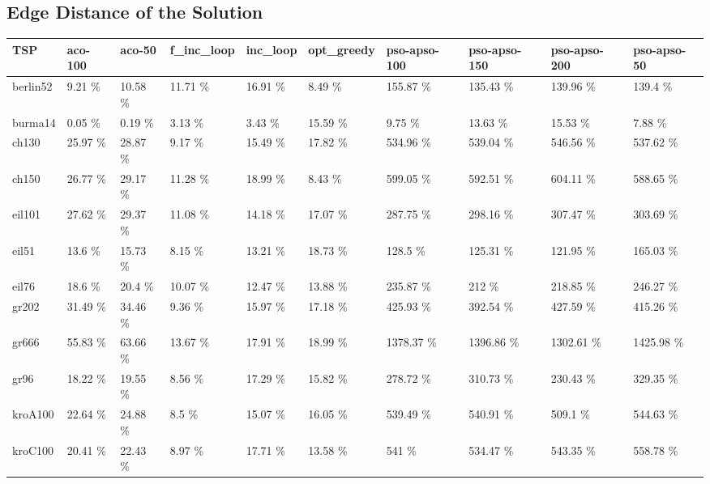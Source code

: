 \documentclass[conference]{IEEEtran}
\begin{document}
    \subsection{Edge Distance of the Solution}
    
    \begin{table}[h]
	    \centering
	    \begin{adjustbox}{width=\columnwidth}
	    \begin{tabular}{ | l | l | l | l | l | l | l | l | l | l | }
	         \hline
   TSP & aco-100 & aco-50 & f\_inc\_loop & inc\_loop & opt\_greedy & pso-apso-100 & pso-apso-150 & pso-apso-200 & pso-apso-50  \\ \hline\hline
berlin52 & 9.21 \% & 10.58 \% & 11.71 \% & 16.91 \% & 8.49 \% & 155.87 \% & 135.43 \% & 139.96 \% & 139.4 \%  \\ \hline
burma14 & 0.05 \% & 0.19 \% & 3.13 \% & 3.43 \% & 15.59 \% & 9.75 \% & 13.63 \% & 15.53 \% & 7.88 \%  \\ \hline
ch130 & 25.97 \% & 28.87 \% & 9.17 \% & 15.49 \% & 17.82 \% & 534.96 \% & 539.04 \% & 546.56 \% & 537.62 \%  \\ \hline
ch150 & 26.77 \% & 29.17 \% & 11.28 \% & 18.99 \% & 8.43 \% & 599.05 \% & 592.51 \% & 604.11 \% & 588.65 \%  \\ \hline
eil101 & 27.62 \% & 29.37 \% & 11.08 \% & 14.18 \% & 17.07 \% & 287.75 \% & 298.16 \% & 307.47 \% & 303.69 \%   \\ \hline
eil51 & 13.6 \% & 15.73 \% & 8.15 \% & 13.21 \% & 18.73 \% & 128.5 \% & 125.31 \% & 121.95 \% & 165.03 \%   \\ \hline
eil76 & 18.6 \% & 20.4 \% & 10.07 \% & 12.47 \% & 13.88 \% & 235.87 \% & 212 \% & 218.85 \% & 246.27 \%   \\ \hline
gr202 & 31.49 \% & 34.46 \% & 9.36 \% & 15.97 \% & 17.18 \% & 425.93 \% & 392.54 \% & 427.59 \% & 415.26 \%   \\ \hline
gr666 & 55.83 \% & 63.66 \% & 13.67 \% & 17.91 \% & 18.99 \% & 1378.37 \% & 1396.86 \% & 1302.61 \% & 1425.98 \%   \\ \hline
gr96 & 18.22 \% & 19.55 \% & 8.56 \% & 17.29 \% & 15.82 \% & 278.72 \% & 310.73 \% & 230.43 \% & 329.35 \%   \\ \hline
kroA100 & 22.64 \% & 24.88 \% & 8.5 \% & 15.07 \% & 16.05 \% & 539.49 \% & 540.91 \% & 509.1 \% & 544.63 \%   \\ \hline
kroC100 & 20.41 \% & 22.43 \% & 8.97 \% & 17.71 \% & 13.58 \% & 541 \% & 534.47 \% & 543.35 \% & 558.78 \%   \\ \hline

\end{tabular}
\end{adjustbox}
\end{table}
\end{document}
